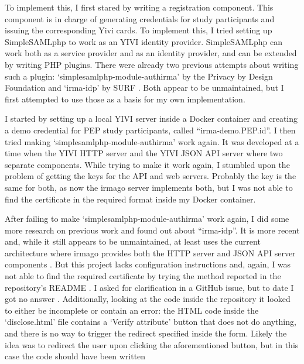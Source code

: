 \documentclass{report}
\begin{document}
To implement this, I first stared by writing a registration component. This component is in charge of generating credentials for study participants and issuing the corresponding
Yivi cards.  To implement this, I tried setting up SimpleSAMLphp \cite{simplesamlphp} to work as an YIVI \cite{about-irma} identity provider. SimpleSAMLphp can work both as a
service provider and as an identity provider, and can be extended by writing PHP plugins. There were already two previous attempts about writing such a plugin:
\enquote*{simplesamlphp-module-authirma} \cite{simplesamlphp-module-authirma} by the Privacy by Design Foundation \cite{privacybydesignfoundation} and \enquote*{irma-idp}
\cite{irma-idp} by SURF \cite{surf}.  Both appear to be unmaintained, but I first attempted to use those as a basis for my own implementation. \par I started by setting up a local
YIVI server inside a Docker container and creating a demo credential \cite{irma-docs-issuer} for PEP study participants, called \enquote{irma-demo.PEP.id}. I then tried making
\enquote*{simplesamlphp-module-authirma} work again. It was developed at a time when the YIVI HTTP server and the YIVI JSON API server where two separate components. While trying
to make it work again, I stumbled upon the problem of getting the keys for the API and web servers. Probably the key is the same for both, as now the irmago server
\cite{irma-docs-server} implements both, but I was not able to find the certificate in the required format inside my Docker container. \par After failing to make
\enquote*{simplesamlphp-module-authirma} work again, I did some more research on previous work and found out about \enquote{irma-idp}. It is more recent and, while it still appears
to be unmaintained, at least uses the current architecture where irmago provides both the HTTP server and JSON API server components \cite{irma-docs-server}. But this project lacks
configuration instructions and, again, I was not able to find the required certificate by trying the method reported in the repository's README \cite{irma-idp}. I asked for
clarification in a GitHub issue, but to date I got no answer \cite{irma-idp-issue}. Additionally, looking at the code inside the repository it looked to either be incomplete or
contain an error: the HTML code inside the \enquote*{disclose.html} file contains a \enquote*{Verify attribute} button that does not do anything, and there is no way to trigger the
redirect specified inside the form. Likely the idea was to redirect the user upon clicking the aforementioned button, but in this case the code should have been written
\end{document}
